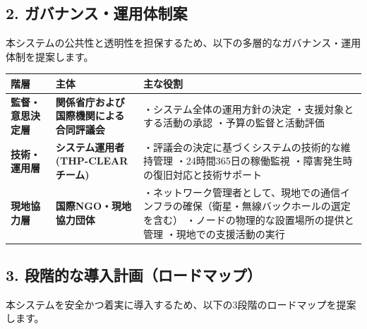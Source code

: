 \documentclass[
  a4paper,
  ja=standard,
  xelatex]{bxjsarticle}
\begin{document}
\subsection{\texorpdfstring{\textbf{2.
ガバナンス・運用体制案}}{2. ガバナンス・運用体制案}}\label{ux30acux30d0ux30caux30f3ux30b9ux904bux7528ux4f53ux5236ux6848}

本システムの公共性と透明性を担保するため、以下の多層的なガバナンス・運用体制を提案します。

\begin{longtable}[]{@{}
  >{\raggedright\arraybackslash}p{}
  >{\raggedright\arraybackslash}p{}
  >{\raggedright\arraybackslash}p{}@{}}
\toprule\noalign{}
\begin{minipage}[b]{\linewidth}\raggedright
階層
\end{minipage} & \begin{minipage}[b]{\linewidth}\raggedright
主体
\end{minipage} & \begin{minipage}[b]{\linewidth}\raggedright
主な役割
\end{minipage} \\
\midrule\noalign{}
\endhead
\bottomrule\noalign{}
\endlastfoot
\textbf{監督・意思決定層} &
\textbf{関係省庁および国際機関による合同評議会} &
・システム全体の運用方針の決定 ・支援対象とする活動の承認
・予算の監督と活動評価 \\
\textbf{技術・運用層} & \textbf{システム運用者 (THP-CLEARチーム)} &
・評議会の決定に基づくシステムの技術的な維持管理 ・24時間365日の稼働監視
・障害発生時の復旧対応と技術サポート \\
\textbf{現地協力層} & \textbf{国際NGO・現地協力団体} &
・ネットワーク管理者として、現地での通信インフラの確保（衛星・無線バックホールの選定を含む）
・ノードの物理的な設置場所の提供と管理 ・現地での支援活動の実行 \\
\end{longtable}

\subsection{\texorpdfstring{\textbf{3.
段階的な導入計画（ロードマップ）}}{3. 段階的な導入計画（ロードマップ）}}\label{ux6bb5ux968eux7684ux306aux5c0eux5165ux8a08ux753bux30edux30fcux30c9ux30deux30c3ux30d7}

本システムを安全かつ着実に導入するため、以下の3段階のロードマップを提案します。
\end{document}
